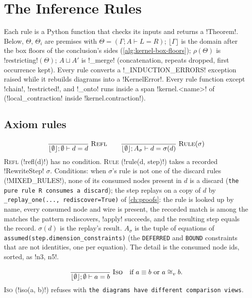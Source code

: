 \section{The Inference Rules}\label{sec:kernel-rules}

Each rule is a Python function that checks its inputs and returns a \py!Theorem!. Below, $\Theta$, $\Theta_i$ are premises with $\Theta = (\Gamma;A\vdash L=R)$; $\lfloor\Gamma\rfloor$ is the domain after the box floors of the conclusion's sides (\cref{alg:kernel-box-floors}); $\rho(\Theta)$ is \py!restricting!$(\Theta)$; $A\sqcup A'$ is \py!_merge! (concatenation, repeats dropped, first occurrence kept). Every rule converts a \py!_INDUCTION_ERRORS! exception raised while it rebuilds diagrams into a \py!KernelError!. Every rule function except \py!chain!, \py!restricted!, and \py!_onto! runs inside a span \code!kernel.<name>! of  (\py!local_contraction! inside \code!kernel.contraction!).

\subsection{Axiom rules}

\[
\frac{}{\lfloor\emptyset\rfloor;\emptyset\vdash d=d}\;\textsc{Refl}
\qquad
\frac{}{\lfloor\emptyset\rfloor; A_\sigma\vdash d=\sigma(d)}\;\textsc{Rule}(\sigma)
\]
\textsc{Refl} (\py!refl(d)!) has no condition. \textsc{Rule} (\py!rule(d, step)!) takes a recorded \py!RewriteStep! $\sigma$. Conditions: when $\sigma$'s rule is not one of the discard rules (\py!MIXED_RULES!), none of its consumed nodes present in $d$ is a discard (\texttt{the pure rule R consumes a discard}); the step replays on a copy of $d$ by \texttt{\_\allowbreak{}replay\_\allowbreak{}one(\allowbreak{}.\allowbreak{}.\allowbreak{}.\allowbreak{},\allowbreak{} rediscover=True)} of \cref{ch:proofs}: the rule is looked up by name, every consumed node and wire is present, the recorded match is among the matches the pattern rediscovers, \py!apply! succeeds, and the resulting step equals the record. $\sigma(d)$ is the replay's result. $A_\sigma$ is the tuple of equations of \texttt{assumed(\allowbreak{}step.\allowbreak{}dimension\_\allowbreak{}constraints)} (the \texttt{DEFERRED} and \texttt{BOUND} constraints that are not identities, one per equation). The detail is the consumed node ids, sorted, as \code!n3, n5!.

\[
\frac{}{\lfloor\emptyset\rfloor;\emptyset\vdash a=b}\;\textsc{Iso}
\quad\text{if } a\equiv b \text{ or } a\cong_v b.
\]
\textsc{Iso} (\py!iso(a, b)!) refuses with \texttt{the diagrams have different comparison views}.

